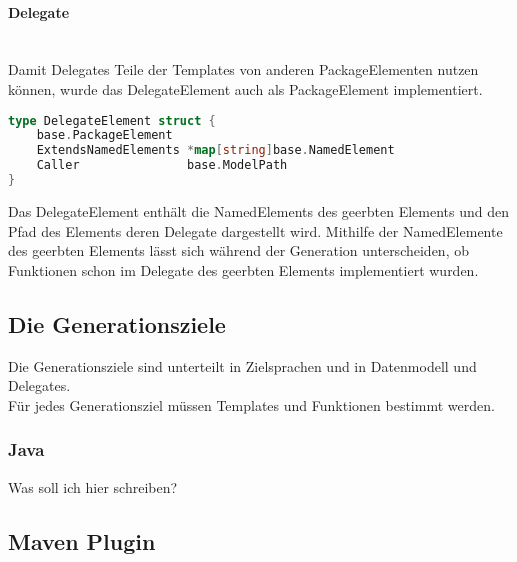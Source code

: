 \documentclass[./einleitung.tex]{subfiles}
\begin{document}
    \paragraph{Delegate}\mbox{}\\
    Damit Delegates Teile der Templates von anderen PackageElementen nutzen können, wurde das DelegateElement auch als PackageElement implementiert.
    \begin{lstlisting}[language=Go, caption=Definition des DelegateElements, label=lst:DelegateElement]
type DelegateElement struct {
	base.PackageElement
	ExtendsNamedElements *map[string]base.NamedElement
	Caller               base.ModelPath
}
    \end{lstlisting}
    Das DelegateElement enthält die NamedElements des geerbten Elements und den Pfad des Elements deren Delegate dargestellt wird.
    Mithilfe der NamedElemente des geerbten Elements lässt sich während der Generation unterscheiden, ob Funktionen schon im Delegate des geerbten Elements implementiert wurden.

    \subsection{Die Generationsziele}\label{subsec:die-generationsziele}
    Die Generationsziele sind unterteilt in Zielsprachen und in Datenmodell und Delegates.\\
    Für jedes Generationsziel müssen Templates und Funktionen bestimmt werden.

    \subsubsection{Java}
    Was soll ich hier schreiben?
    \subsection{Maven Plugin}
\end{document}
